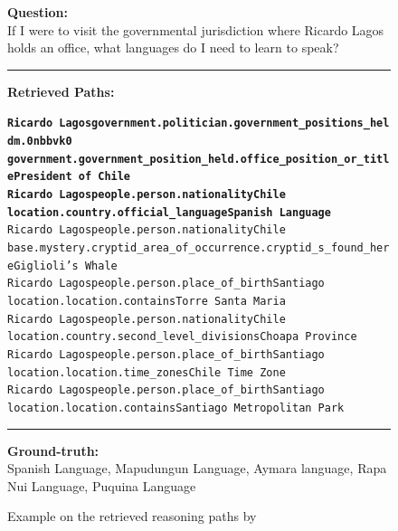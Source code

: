 \begin{figure}[t]
\begin{tcolorbox}[colback=gray!5!white,
                  colframe=gray!75!black,
                  title=CWQ-WebQTrn-2069\_9a4491f5f6a880a03bd96b8180bace4c]
\scriptsize

\textbf{Question:}\\
If I were to visit the governmental jurisdiction where Ricardo Lagos holds an office, what languages do I need to learn to speak?

\rule{\linewidth}{0.4pt}

\textbf{Retrieved Paths:}\\[2pt]
{\raggedright
\texttt{\textbf{Ricardo Lagos\patharrow government.politician.government\_positions\_held\patharrow m.0nbbvk0\patharrow \\ government.government\_position\_held.office\_position\_or\_title\patharrow President of Chile}}\\[6pt]

\texttt{\textbf{Ricardo Lagos\patharrow people.person.nationality\patharrow Chile\patharrow \\ location.country.official\_language\patharrow Spanish Language}}\\[6pt]

\texttt{Ricardo Lagos\patharrow people.person.nationality\patharrow Chile\patharrow \\ base.mystery.cryptid\_area\_of\_occurrence.cryptid\_s\_found\_here\patharrow Giglioli's Whale}\\[6pt]

\texttt{Ricardo Lagos\patharrow people.person.place\_of\_birth\patharrow Santiago\patharrow \\ location.location.contains\patharrow Torre Santa Maria}\\[6pt]

\texttt{Ricardo Lagos\patharrow people.person.nationality\patharrow Chile\patharrow \\  location.country.second\_level\_divisions\patharrow Choapa Province}\\[6pt]

\texttt{Ricardo Lagos\patharrow people.person.place\_of\_birth\patharrow Santiago\patharrow \\ location.location.time\_zones\patharrow Chile Time Zone}\\[6pt]

\texttt{Ricardo Lagos\patharrow people.person.place\_of\_birth\patharrow Santiago\patharrow \\ location.location.contains\patharrow Santiago Metropolitan Park}\\[6pt]

\par}

\rule{\linewidth}{0.4pt}

\textbf{Ground-truth:}\\
Spanish Language, Mapudungun Language, Aymara language, Rapa Nui Language, Puquina Language

\end{tcolorbox}
\caption{Example on the retrieved reasoning paths by \proj}
\label{fig:example7}
\end{figure}


